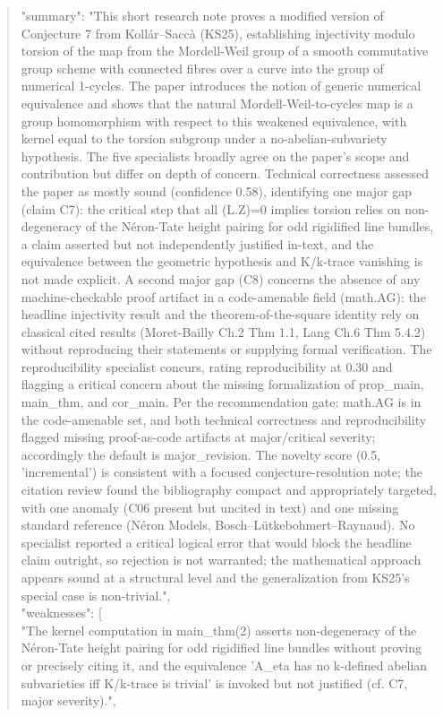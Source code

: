 \documentclass[11pt]{article}
\begin{document}
\begin{quote}
  "summary": "This short research note proves a modified version of Conjecture 7 from Kollár--Saccà (KS25), establishing injectivity modulo torsion of the map from the Mordell-Weil group of a smooth commutative group scheme with connected fibres over a curve into the group of numerical 1-cycles. The paper introduces the notion of generic numerical equivalence and shows that the natural Mordell-Weil-to-cycles map is a group homomorphism with respect to this weakened equivalence, with kernel equal to the torsion subgroup under a no-abelian-subvariety hypothesis. The five specialists broadly agree on the paper's scope and contribution but differ on depth of concern. Technical correctness assessed the paper as mostly sound (confidence 0.58), identifying one major gap (claim C7): the critical step that all (L.Z)=0 implies torsion relies on non-degeneracy of the Néron-Tate height pairing for odd rigidified line bundles, a claim asserted but not independently justified in-text, and the equivalence between the geometric hypothesis and K/k-trace vanishing is not made explicit. A second major gap (C8) concerns the absence of any machine-checkable proof artifact in a code-amenable field (math.AG): the headline injectivity result and the theorem-of-the-square identity rely on classical cited results (Moret-Bailly Ch.2 Thm 1.1, Lang Ch.6 Thm 5.4.2) without reproducing their statements or supplying formal verification. The reproducibility specialist concurs, rating reproducibility at 0.30 and flagging a critical concern about the missing formalization of prop\_main, main\_thm, and cor\_main. Per the recommendation gate: math.AG is in the code-amenable set, and both technical correctness and reproducibility flagged missing proof-as-code artifacts at major/critical severity; accordingly the default is major\_revision. The novelty score (0.5, 'incremental') is consistent with a focused conjecture-resolution note; the citation review found the bibliography compact and appropriately targeted, with one anomaly (C06 present but uncited in text) and one missing standard reference (Néron Models, Bosch--Lütkebohmert--Raynaud). No specialist reported a critical logical error that would block the headline claim outright, so rejection is not warranted; the mathematical approach appears sound at a structural level and the generalization from KS25's special case is non-trivial.",\\
  "weaknesses": [\\
    "The kernel computation in main\_thm(2) asserts non-degeneracy of the Néron-Tate height pairing for odd rigidified line bundles without proving or precisely citing it, and the equivalence 'A\_eta has no k-defined abelian subvarieties iff K/k-trace is trivial' is invoked but not justified (cf. C7, major severity).",\\

\end{quote}
\end{document}
